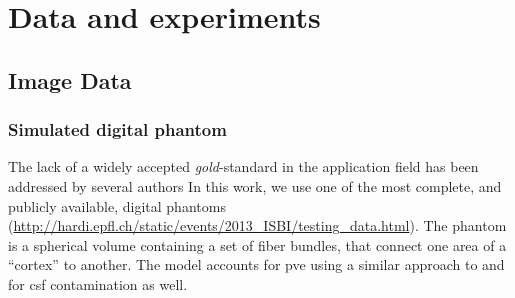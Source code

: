 \section{Data and experiments}
\label{sec:experiments}
%


\subsection{Image Data}
\label{sec:datasets}

\subsubsection{Simulated digital phantom} %
%
The lack of a widely accepted \emph{gold}-standard in the application
field has been addressed by several authors \citep{cote_tractometer:_2013}
In this work, we use one of the most complete, and publicly available,
digital phantoms (\url{http://hardi.epfl.ch/static/events/2013_ISBI/testing_data.html}).
The phantom is a spherical volume containing a set of fiber bundles, that connect 
one area of a ``cortex'' to another. The model accounts for \gls{pve} using 
a similar approach to \citep{close_software_2009} and for \gls{csf} contamination
as well.

